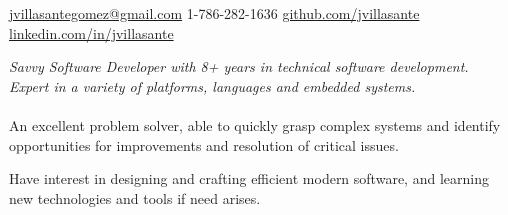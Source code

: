 \documentclass[10pt,a4paper]{article}
\begin{document}
\sloppy  %



\nobreakvspace{0.3em}  %

\noindent\href{mailto:jvillasantegomez.at.gmail.dot.com}{jvillasantegomez\mbox{}@\mbox{}gmail.com}\sbull
\textsmaller{+}1-786-282-1636\sbull
\href{https://github.com/jvillasante}{github.com/jvillasante}\sbull
\href{http://linkedin.com/in/jvillasante}{linkedin.com/in/jvillasante}
\\

\spacedhrule{0.9em}{-0.4em}  %


\vspace{-1.3em}  %
\begin{multicols}{2}  %
\noindent \emph{Savvy Software Developer with 8+ years in technical software development. Expert in a variety of platforms, languages and embedded systems.}
\\
\\
An excellent problem solver, able to quickly grasp complex systems and identify opportunities for improvements and resolution of critical issues.

Have interest in designing and crafting efficient modern software, and learning new technologies and tools if need arises.
\end{multicols}

\spacedhrule{0em}{-0.4em}

\end{document}
